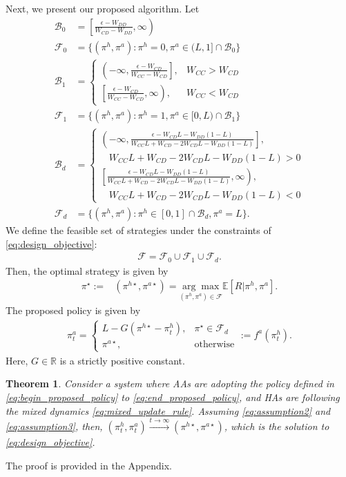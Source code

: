 \documentclass[letterpaper]{article} %
\newtheorem{theorem}{Theorem}
\begin{document}
Next, we present our proposed algorithm. Let
\begin{align}
    \mathcal{B}_0&=\left[\frac{\epsilon-W_{DD}}{W_{CD}-W_{DD}},\infty\right)\label{eq:begin_proposed_policy}\\
    \mathcal{F}_0&=\{(\pi^h,\pi^a):\pi^h=0,\pi^a\in(L,1]\cap\mathcal{B}_0\}\\
    \mathcal{B}_1&=\begin{cases}
        \left(-\infty,\frac{\epsilon-W_{CD}}{W_{CC}-W_{CD}}\right], & W_{CC}>W_{CD} \\
        \left[\frac{\epsilon-W_{CD}}{W_{CC}-W_{CD}},\infty\right), & W_{CC}<W_{CD}
    \end{cases}\\
    \mathcal{F}_1&=\{(\pi^h,\pi^a):\pi^h=1,\pi^a\in[0,L)\cap\mathcal{B}_1\}\\
    \mathcal{B}_d&=\begin{cases}
        \left(-\infty,\frac{\epsilon-W_{CD}L-W_{DD}(1-L)}{W_{CC}L+W_{CD}-2W_{CD}L-W_{DD}(1-L)}\right], \\
        \ \ \ \ W_{CC}L+W_{CD}-2W_{CD}L-W_{DD}(1-L)>0 \\
        \left[\frac{\epsilon-W_{CD}L-W_{DD}(1-L)}{W_{CC}L+W_{CD}-2W_{CD}L-W_{DD}(1-L)},\infty\right), \\
        \ \ \ \ W_{CC}L+W_{CD}-2W_{CD}L-W_{DD}(1-L)<0
    \end{cases}\\
    \mathcal{F}_d&=\{(\pi^h,\pi^a):\pi^h\in[0,1]\cap\mathcal{B}_d,\pi^a=L\}.
\end{align}
We define the feasible set of strategies under the constraints of \eqref{eq:design_objective}:
\begin{align}
\label{eq:end_feasible}
    \mathcal{F}= \mathcal{F}_0\cup \mathcal{F}_1\cup \mathcal{F}_d.
\end{align}
Then, the optimal strategy is given by
\begin{align}
    \pi^\star:=&(\pi^{h \star},\pi^{a \star})=\underset{(\pi^h,\pi^a)\in\mathcal{F}}{\arg\max}\mathbb{E}[R|\pi^h,\pi^a].\label{eq:pi_pound}
\end{align}
The proposed policy is given by
\begin{align}
\label{eq:end_proposed_policy}
    \pi^a_t=\begin{cases}
        L-G(\pi^{h \star}-\pi^h_t), & \pi^{\star}\in\mathcal{F}_d\\
        \pi^{a \star}, & \textrm{otherwise}
    \end{cases}:=f^a(\pi^h_t).
\end{align}
Here, $G \in \mathbb R$ is a strictly positive constant.
\begin{theorem} \label{thm:proposed_method_combined}
Consider a system where AAs are adopting the policy defined in \eqref{eq:begin_proposed_policy} to \eqref{eq:end_proposed_policy}, and HAs are following the mixed dynamics \eqref{eq:mixed_update_rule}. Assuming \eqref{eq:assumption2} and \eqref{eq:assumption3}, then, $(\pi^h_t,\pi^a_t) \xrightarrow[]{t\rightarrow\infty} (\pi^{h \star},\pi^{a \star})$, which is the solution to \eqref{eq:design_objective}.
\end{theorem}
The proof is provided in the Appendix.
\end{document}
